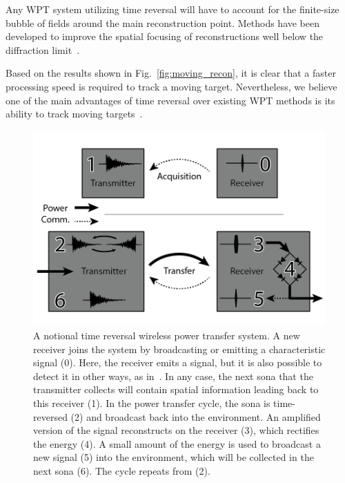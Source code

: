 Any WPT system utilizing time reversal will have to account for the
finite-size bubble of fields around the main reconstruction point.
Methods have been developed to improve the spatial focusing of reconstructions
well below the diffraction limit~\cite{lerosey-focusing}.

Based on the results shown in Fig.~\ref{fig:moving_recon}, it is clear that a faster
processing speed is required to track a moving target.
%
Nevertheless, we believe one of the main advantages of time reversal over
existing WPT methods is its ability to track moving
targets~\cite{fink,nltr-wave-chaotic}.


\begin{figure}[t]
\includegraphics[width=\columnwidth]{figs/WPTSysAlt}
\caption{A notional time reversal wireless power transfer system. A new receiver joins the system by broadcasting or emitting a characteristic signal (0). Here, the receiver emits a signal, but it is also possible to detect it in other ways, as in~\cite{nltr-wave-chaotic}. In any case, the next sona that the transmitter collects will contain spatial information leading back to this receiver (1). In the power transfer cycle, the sona is time-reversed (2) and broadcast back into the environment. An amplified version of the signal reconstructs on the receiver (3), which rectifies the energy (4). A small amount of the energy is used to broadcast a new signal (5) into the environment, which will be collected in the next sona (6). The cycle repeats from (2).}
\label{fig:SysImage}
\end{figure}

